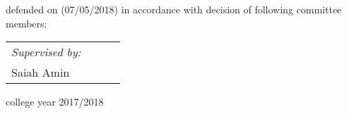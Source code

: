 \begin{titlepage}
\begin{center}
{ defended on (07/05/2018) in accordance with decision of following committee members:  }\\
\vspace*{6mm}
\end{center}\par

\hspace{-1cm}\begin{tabular}{llcl}
 \hspace{5.5cm}	\textit{ Supervised  by:}\\	%
	\hspace{6cm}	 Saiah Amin%
	   
\end{tabular}

\begin{flushleft}
\vspace{2cm}
\centering
{ college year 2017/2018}\par
\end{flushleft}


\end{titlepage}

\thispagestyle{empty}

